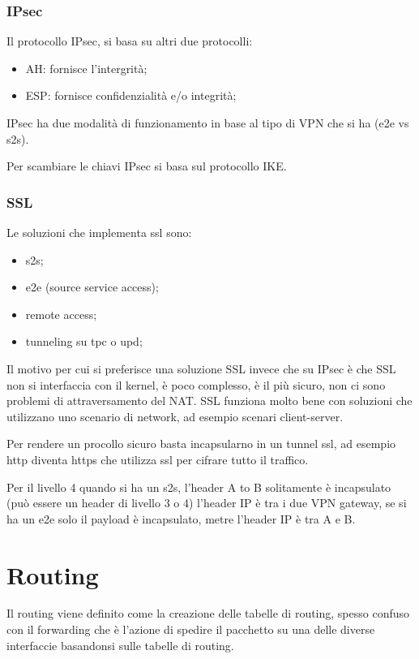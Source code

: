 \documentclass[12pt]{article}
\begin{document}
\subsubsection{IPsec}
Il protocollo IPsec, si basa su altri due protocolli:
\begin{itemize}
    \item AH: fornisce l'intergrit\`a;
    \item ESP: fornisce confidenzialit\`a e/o integrit\`a;
\end{itemize}
IPsec ha due modalit\`a di funzionamento in base al tipo di VPN che si ha (e2e vs s2s).

Per scambiare le chiavi IPsec si basa sul protocollo IKE.


\subsubsection{SSL}
Le soluzioni che implementa ssl sono:
\begin{itemize}
    \item s2s;
    \item e2e (source service access);
    \item remote access;
    \item tunneling su tpc o upd;
\end{itemize}
Il motivo per cui si preferisce una soluzione SSL invece che su IPsec \`e che SSL non si interfaccia con il kernel, \`e poco complesso, \`e il pi\`u sicuro, non ci sono problemi di attraversamento del NAT. SSL funziona molto bene con soluzioni che utilizzano uno scenario di network, ad esempio scenari client-server.

Per rendere un procollo sicuro basta incapsularno in un tunnel ssl, ad esempio http diventa https che utilizza ssl per cifrare tutto il traffico.


Per il livello 4 quando si ha un s2s, l'header  A to B solitamente \`e incapsulato (pu\`o essere un header di livello 3 o 4) l'header IP \`e tra i due VPN gateway, se si ha un e2e solo il payload \`e incapsulato, metre l'header IP \`e tra A e B.



\newpage
\section{Routing}
Il routing viene definito come la creazione delle tabelle di routing, spesso confuso con il forwarding che \`e l'azione di spedire il pacchetto su una delle diverse interfaccie basandonsi sulle tabelle di routing.
\end{document}
